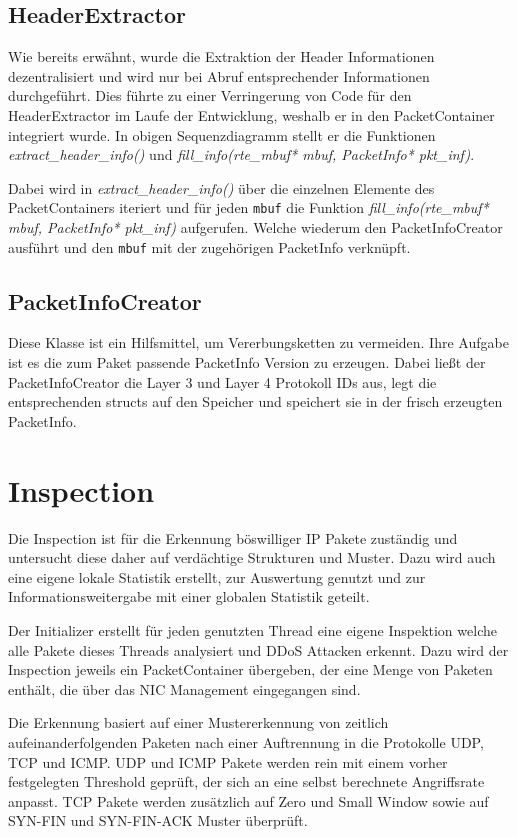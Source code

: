 \documentclass[../review_2.tex]{subfiles}
\begin{document}
\subsection{HeaderExtractor}
Wie bereits erwähnt, wurde die Extraktion der Header Informationen dezentralisiert und wird nur bei Abruf entsprechender Informationen durchgeführt. Dies führte zu einer Verringerung von Code für den HeaderExtractor im Laufe der Entwicklung, weshalb er in den PacketContainer integriert wurde. In obigen Sequenzdiagramm stellt er die Funktionen \textit{extract\_header\_info()} und \textit{fill\_info(rte\_mbuf* mbuf, PacketInfo* pkt\_inf)}.

Dabei wird in \textit{extract\_header\_info()} über die einzelnen Elemente des PacketContainers iteriert und für jeden \texttt{mbuf} die Funktion \textit{fill\_info(rte\_mbuf* mbuf, PacketInfo* pkt\_inf)} aufgerufen. Welche wiederum den PacketInfoCreator ausführt und den \texttt{mbuf} mit der zugehörigen PacketInfo verknüpft.

\subsection{PacketInfoCreator}
Diese Klasse ist ein Hilfsmittel, um Vererbungsketten zu vermeiden. Ihre Aufgabe ist es die zum Paket passende PacketInfo Version zu erzeugen. Dabei ließt der PacketInfoCreator die Layer 3 und Layer 4 Protokoll IDs aus, legt die entsprechenden structs auf den Speicher und speichert sie in der frisch erzeugten PacketInfo.

\section{Inspection}
Die Inspection ist für die Erkennung böswilliger IP Pakete zuständig und untersucht diese daher auf verdächtige Strukturen und Muster. Dazu wird auch eine eigene lokale Statistik erstellt, zur Auswertung genutzt und zur Informationsweitergabe mit einer globalen Statistik geteilt.

Der Initializer erstellt für jeden genutzten Thread eine eigene Inspektion welche alle Pakete dieses Threads analysiert und DDoS Attacken erkennt. Dazu wird der Inspection jeweils ein PacketContainer übergeben, der eine Menge von Paketen enthält, die über das NIC Management eingegangen sind.

Die Erkennung basiert auf einer Mustererkennung von zeitlich aufeinanderfolgenden Paketen nach einer Auftrennung in die Protokolle UDP, TCP und ICMP. UDP und ICMP Pakete werden rein mit einem vorher festgelegten Threshold geprüft, der sich an eine selbst berechnete Angriffsrate anpasst. TCP Pakete werden zusätzlich auf Zero und Small Window sowie auf SYN-FIN und SYN-FIN-ACK Muster überprüft.
\end{document}
